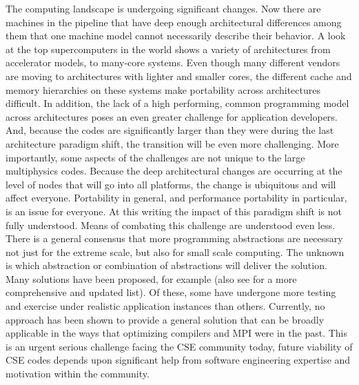 The computing landscape is undergoing significant changes. Now there are machines
in the pipeline that have deep enough architectural differences among
them that one machine model cannot necessarily describe their behavior.  A look at the top supercomputers in the world shows a variety of architectures from accelerator models, to many-core systems.  Even though many different vendors are moving to architectures with lighter and smaller cores, the different cache and memory hierarchies on these systems make portability across architectures difficult.  In addition, the lack of a high performing, common programming model across architectures poses an even greater challenge for application developers.  And, because
the codes are significantly larger than they were during the last
architecture paradigm shift, the transition will be even more challenging.  More importantly, some aspects of the
challenges are not unique to the large multiphysics codes. Because the
deep architectural changes are occurring at the level of nodes that
will go into all platforms, the change is ubiquitous and will
affect everyone. Portability in general, and performance
portability in particular, is an issue for everyone. At this writing
the impact of this paradigm shift is not fully understood. Means of
combating this challenge are understood even less. There is a general
consensus that more programming abstractions are necessary not just
for the extreme scale, but also for small scale computing. The unknown
is which abstraction or combination of abstractions will deliver the
solution. Many solutions have been proposed, for example \cite{PADAL14} (also
see \cite{IDEAS} for a more comprehensive and updated
list). Of these, some have undergone more testing and exercise under
realistic application instances than others. Currently, no approach has been shown to provide a general solution that can be broadly
applicable in the ways that optimizing compilers and MPI were
in the past. This is an urgent serious challenge facing the CSE
community today, future viability of CSE codes depends upon
significant help from software engineering expertise and motivation
within the community. 

